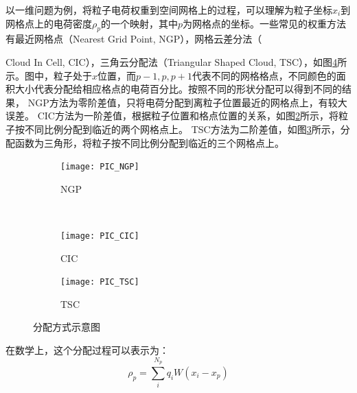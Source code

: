 以一维问题为例，将粒子电荷权重到空间网格上的过程，可以理解为粒子坐标$x_i$到网格点上的电荷密度$\rho_p$的一个映射，其中$p$为网格点的坐标。一些常见的权重方法有最近网格点（Nearest Grid Point, NGP），网格云差分法（{Cloud In Cell, CIC），三角云分配法（Triangular Shaped Cloud, TSC），如图\ref{fig:PIC_weighting}所示。图中，粒子处于$x$位置，而$p-1,p,p+1$代表不同的网格格点，不同颜色的面积大小代表分配给相应格点的电荷百分比。按照不同的形状分配可以得到不同的结果，
NGP方法为零阶差值，只将电荷分配到离粒子位置最近的网格点上，有较大误差。
CIC方法为一阶差值，根据粒子位置和格点位置的关系，如图\ref{fig:PIC_CIC}所示，将粒子按不同比例分配到临近的两个网格点上。
TSC方法为二阶差值，如图\ref{fig:PIC_TSC}所示，分配函数为三角形，将粒子按不同比例分配到临近的三个网格点上。
\begin{figure}[!htbp]
  \centering
  \begin{subfigure}[b]{0.8\textwidth}
    \texttt{[image: PIC\_NGP]}
    \caption{NGP}
    \label{fig:PIC_NGP}
  \end{subfigure}%
  ~%
  \begin{subfigure}[b]{0.8\textwidth}
    \texttt{[image: PIC\_CIC]}
    \caption{CIC}
    \label{fig:PIC_CIC}
  \end{subfigure}
  \begin{subfigure}[b]{0.8\textwidth}
    \texttt{[image: PIC\_TSC]}
    \caption{TSC}
    \label{fig:PIC_TSC}
  \end{subfigure}%
  \caption{分配方式示意图}
  \label{fig:PIC_weighting}
\end{figure}

在数学上，这个分配过程可以表示为：
\begin{equation}\label{eq:weight}
  \rho_p=\sum_{i}^{N_p} q_i W(x_i-x_p)
\end{equation}

}
